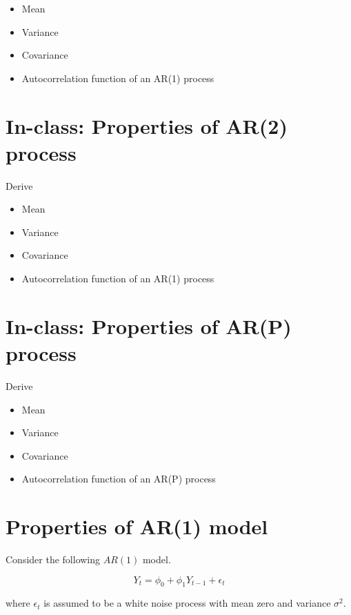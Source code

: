 \documentclass[
  11pt,
  a4paper,
]{report}
\begin{document}
\begin{itemize}
\item
  Mean
\item
  Variance
\item
  Covariance
\item
  Autocorrelation function of an AR(1) process
\end{itemize}

\section{In-class: Properties of AR(2)
process}\label{in-class-properties-of-ar2-process}

Derive

\begin{itemize}
\item
  Mean
\item
  Variance
\item
  Covariance
\item
  Autocorrelation function of an AR(1) process
\end{itemize}

\section{In-class: Properties of AR(P)
process}\label{in-class-properties-of-arp-process}

Derive

\begin{itemize}
\item
  Mean
\item
  Variance
\item
  Covariance
\item
  Autocorrelation function of an AR(P) process
\end{itemize}

\section{Properties of AR(1) model}\label{properties-of-ar1-model}

Consider the following \(AR(1)\) model.

\begin{equation}
Y_t=\phi_0+\phi_1Y_{t-1}+\epsilon_{t}
\end{equation}

where \({\epsilon_t}\) is assumed to be a white noise process with mean
zero and variance \(\sigma^2\).
\end{document}
